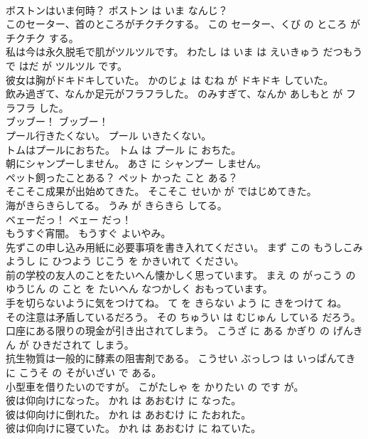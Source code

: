 \documentclass[8pt]{extreport}
\begin{document}
\begin{CJK}{UTF8}{min}
\\	ボストンはいま何時？	ボストン は いま なんじ？	
\\	このセーター、首のところがチクチクする。	この セーター、くび の ところ が チクチク する。	
\\	私は今は永久脱毛で肌がツルツルです。	わたし は いま は えいきゅう だつもう で はだ が ツルツル です。	
\\	彼女は胸がドキドキしていた。	かのじょ は むね が ドキドキ していた。	
\\	飲み過ぎて、なんか足元がフラフラした。	のみすぎて、なんか あしもと が フラフラ した。	
\\	ブッブー！	ブッブー！	
\\	プール行きたくない。	プール いきたくない。	
\\	トムはプールにおちた。	トム は プール に おちた。	
\\	朝にシャンプーしません。	あさ に シャンプー しません。	
\\	ペット飼ったことある？	ペット かった こと ある？	
\\	そこそこ成果が出始めてきた。	そこそこ せいか が ではじめてきた。	
\\	海がきらきらしてる。	うみ が きらきら してる。	
\\	ベェーだっ！	ベェー だっ！	
\\	もうすぐ宵闇。	もうすぐ よいやみ。	
\\	先ずこの申し込み用紙に必要事項を書き入れてください。	まず この もうしこみ ようし に ひつよう じこう を かきいれて ください。	
\\	前の学校の友人のことをたいへん懐かしく思っています。	まえ の がっこう の ゆうじん の こと を たいへん なつかしく おもっています。	
\\	手を切らないように気をつけてね。	て を きらない よう に きをつけて ね。	
\\	その注意は矛盾しているだろう。	その ちゅうい は むじゅん している だろう。	
\\	口座にある限りの現金が引き出されてしまう。	こうざ に ある かぎり の げんきん が ひきだされて しまう。	
\\	抗生物質は一般的に酵素の阻害剤である。	こうせい ぶっしつ は いっぱんてき に こうそ の そがいざい で ある。	
\\	小型車を借りたいのですが。	こがたしゃ を かりたい の です が。	
\\	彼は仰向けになった。	かれ は あおむけ に なった。	
\\	彼は仰向けに倒れた。	かれ は あおむけ に たおれた。	
\\	彼は仰向けに寝ていた。	かれ は あおむけ に ねていた。	

\end{CJK}
\end{document}
